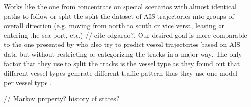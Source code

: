 Works like the one from \cite{martinsen2018curved} concentrate on special scenarios with almost identical paths to follow or split the split the dataset of AIS trajectories into groups of overall direction (e.g. moving from north to south or vice versa, leaving or entering the sea port, etc.) // cite edgardo?. Our desired goal is more comparable to the one presented by \cite{venskus2021unsupervised} who also try to predict vessel trajectories based on AIS data but without restricting or categorizing the tracks in a major way. The only factor that they use to split the tracks is the vessel type as they found out that different vessel types generate different traffic pattern thus they use one model per vessel type \cite[p.~729]{venskus2021unsupervised}.

// Markov property? history of states?